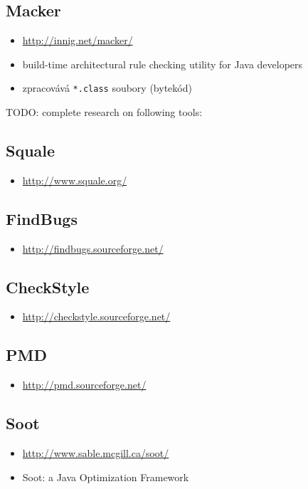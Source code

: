 \subsection{Macker}
\begin{itemize}
\item \href{http://innig.net/macker/}{http://innig.net/macker/}
\item build-time architectural rule checking utility for Java developers
\item zpracovává \verb+*.class+ soubory (bytekód)
\end{itemize}

TODO: complete research on following tools:

\subsection{Squale}
\begin{itemize}
\item \href{http://www.squale.org/}{http://www.squale.org/}
\end{itemize}

\subsection{FindBugs}
\begin{itemize}
\item \href{http://findbugs.sourceforge.net/}{http://findbugs.sourceforge.net/}
\end{itemize}

\subsection{CheckStyle}
\begin{itemize}
\item \href{http://checkstyle.sourceforge.net/}{http://checkstyle.sourceforge.net/}
\end{itemize}

\subsection{PMD}
\begin{itemize}
\item \href{http://pmd.sourceforge.net/}{http://pmd.sourceforge.net/}
\end{itemize}

\subsection{Soot}
\begin{itemize}
\item \href{http://www.sable.mcgill.ca/soot/}{http://www.sable.mcgill.ca/soot/}
\item Soot: a Java Optimization Framework
\end{itemize}
